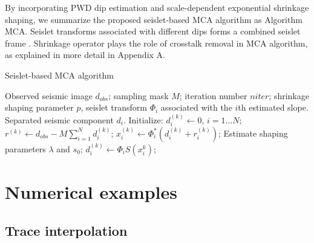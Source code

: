 By incorporating PWD dip estimation and scale-dependent exponential shrinkage shaping, we summarize the proposed seislet-based MCA algorithm as Algorithm MCA. Seislet transforms associated with different dips forms a combined seislet frame \citep{fomel2010seislet}. Shrinkage operator plays the role of crosstalk removal in MCA algorithm, as explained in more detail in Appendix A.

\begin{algorithm}[htb]
    \caption{Seislet-based MCA algorithm}
    \begin{algorithmic}[1]
    \renewcommand{\algorithmicrequire}{\textbf{Input:}}
    \REQUIRE Observed seismic image $d_{obs}$; sampling mask $M$; iteration number $niter$; shrinkage shaping parameter $p$, seislet transform $\Phi_i$  associated with the $i$th estimated slope.
    \renewcommand{\algorithmicensure}{\textbf{Output:}}
    \ENSURE Separated seismic component $d_i$.
    \STATE Initialize: $d_i^{(k)}\leftarrow 0$, $ i=1\ldots N$;
            \STATE  $r^{(k)} \leftarrow d_{obs}-M\sum_{i=1}^N d_i^{(k)}$;
                \STATE  $x_i^{(k)}\leftarrow \Phi_i^*(d_i^{(k)}+r_i^{(k)})$;
                \STATE  Estimate shaping parameters $\lambda$ and $s_0$;
                \STATE  $d_i^{(k)}\leftarrow \Phi_i S(x_i^k) $;
            \ENDFOR
        \ENDFOR
    \end{algorithmic}
\end{algorithm}


\section{Numerical examples}

\subsection{Trace interpolation}

